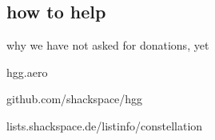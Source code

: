 \subsection{how to help}
	\begin{frame}{why we have not asked for donations, yet}
	\end{frame}
	\begin{frame}{hgg.aero}
	\end{frame}
	\begin{frame}{github.com/shackspace/hgg}
	\end{frame}
	\begin{frame}{lists.shackspace.de/listinfo/constellation}
	\end{frame}



% 
% 
